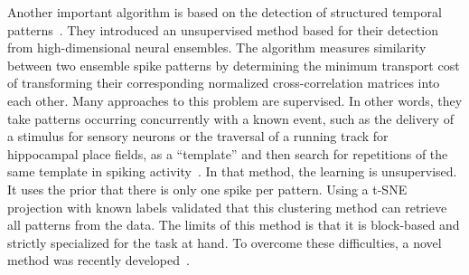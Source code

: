 \documentclass[brainsci, %
               review,submit,pdftex,moreauthors
               ]{Definitions/mdpi}
\begin{document}
Another important algorithm is based on the detection of structured temporal patterns~\citep{grossberger_unsupervised_2018}. They introduced an unsupervised method based for their detection from high-dimensional neural ensembles. The algorithm measures similarity between two ensemble spike patterns by determining the minimum transport cost of transforming their corresponding normalized cross-correlation matrices into each other. Many approaches to this problem are supervised. In other words, they take patterns occurring concurrently with a known event, such as the delivery of a stimulus for sensory neurons or the traversal of a running track for hippocampal place fields, as a ``template'' and then search for repetitions of the same template in spiking activity~\citep{nadasdy_replay_1999,lee_combinatorial_2004}.
In that method, the learning is unsupervised. It uses the prior that there is only one spike per pattern. 
Using a t-SNE projection with known labels validated that this clustering method can retrieve all patterns from the data.
The limits of this method is that it is block-based and strictly specialized for the task at hand. To overcome these difficulties, a novel method was recently developed~\citep{sotomayor-gomez_spikeship_2021}.
\end{document}
